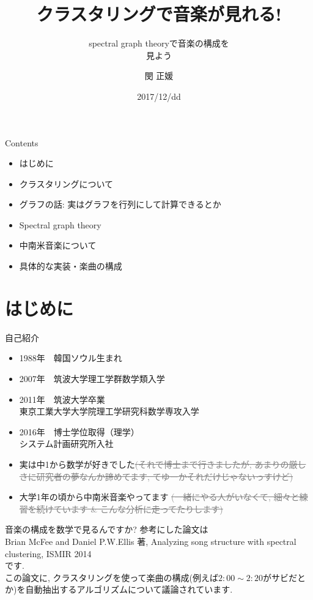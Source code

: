 \documentclass[dvipdfmx,11pt]{beamer}
\title{クラスタリングで音楽が見れる!}
\subtitle{spectral graph theoryで音楽の構成を \\ 見よう}
\author{閔 正媛}
\date{2017/12/dd}
\theoremstyle{definition}
\begin{document}
\begin{frame}
	\titlepage
\end{frame}

\begin{frame}{Contents}
\begin{itemize}
\item はじめに
\item クラスタリングについて
\item グラフの話: 実はグラフを行列にして計算できるとか
\item Spectral graph theory
\item 中南米音楽について
\item 具体的な実装・楽曲の構成
\end{itemize}
\end{frame}

\section{はじめに}
\begin{frame}{自己紹介}
\begin{itemize}
\item 1988年　韓国ソウル生まれ
\item 2007年　筑波大学理工学群数学類入学
\item 2011年　筑波大学卒業 \\ 
\hspace{1.45cm} 東京工業大学大学院理工学研究科数学専攻入学
\item 2016年　博士学位取得（理学） \\ 
\hspace{1.45cm} システム計画研究所入社 \\ 
\item 実は中1から数学が好きでした\textcolor{gray}{\scriptsize \sout{(それで博士まで行きましたが, あまりの厳しさに研究者の夢なんか諦めてます, てゆーかそれだけじゃないっすけど)}}
\item 大学1年の頃から中南米音楽やってます \textcolor{gray}{\scriptsize \sout{(一緒にやる人がいなくて, 細々と練習を続けています \& こんな分析に走ってたりします)}}
\end{itemize}
\end{frame}

\vspace{6pt}
\begin{frame}{音楽の構成を数学で見るんですか?}
参考にした論文は \\
\vspace{6pt} 
Brian McFee and Daniel P.W.Ellis 著, Analyzing song structure with spectral clustering, ISMIR 2014 \\ 
\vspace{6pt}
です. \\ 
\vspace{6pt}
この論文に, クラスタリングを使って楽曲の構成(例えば$2:00 \sim 2:20$がサビだとか)を自動抽出するアルゴリズムについて議論されています.
\end{frame}
\end{document}
